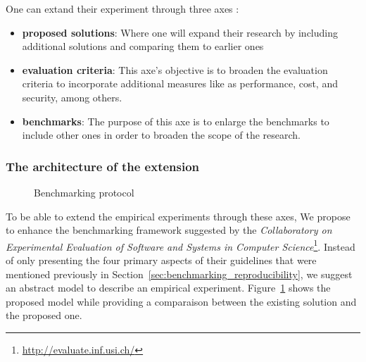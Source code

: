 One can extand their experiment through three axes :
\begin{itemize}
    \item \textbf{proposed solutions}: Where one will expand their research by including additional solutions and comparing them to earlier ones
    \item \textbf{evaluation criteria}: This axe's objective is to broaden the evaluation criteria to incorporate additional measures like as performance, cost, and security, among others.
    \item \textbf{benchmarks}: The purpose of this axe is to enlarge the benchmarks to include other ones in order to broaden the scope of the research.
\end{itemize}

\subsubsection{The architecture of the extension}
\begin{figure}
    \caption{Benchmarking protocol}\label{fig:benchmarkingprotocol}
\end{figure}
To be able to extend the empirical experiments through these axes,
We propose to enhance the benchmarking framework suggested by the \emph{Collaboratory on Experimental Evaluation of Software and Systems in Computer Science}\footnote{\url{http://evaluate.inf.usi.ch/}}.
Instead of only presenting the four primary aspects of their guidelines that were mentioned previously in Section~\ref{sec:benchmarking_reproducibility}, we suggest an abstract model to describe an empirical experiment.
Figure~\ref{fig:benchmarkingprotocol} shows the proposed model while providing a comparaison between the existing solution and the proposed one.

